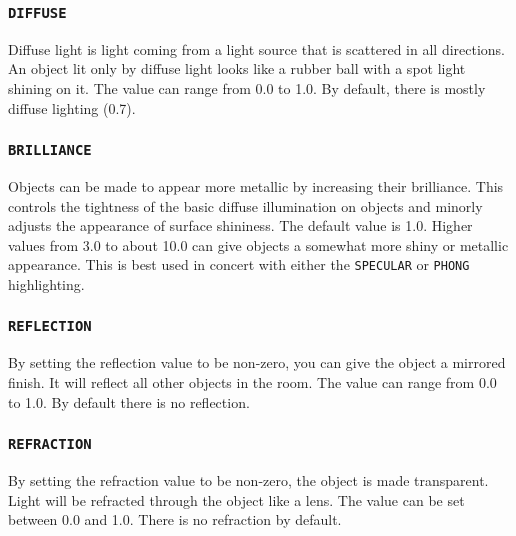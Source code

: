 \subsubsection{{\tt DIFFUSE}}

Diffuse light is light coming from a light source that is scattered in all
directions.  An object lit only by diffuse light looks like a rubber ball with
a spot light shining on it.  The value can range from 0.0 to 1.0.  By default,
there is mostly diffuse lighting (0.7).

\subsubsection{{\tt BRILLIANCE}}

Objects can be made to appear more metallic by increasing their brilliance.
This controls the tightness of the basic diffuse illumination on objects and
minorly adjusts the appearance of surface shininess.  The default value is
1.0.  Higher values from 3.0 to about 10.0 can give objects a somewhat more
shiny or metallic appearance.  This is best used in concert with either the
{\tt SPECULAR} or {\tt PHONG} highlighting.

\subsubsection{{\tt REFLECTION}}

By setting the reflection value to be non-zero, you can give the object a
mirrored finish.  It will reflect all other objects in the room.  The value
can range from 0.0 to 1.0.  By default there is no reflection. 

\subsubsection{{\tt REFRACTION}}

By setting the refraction value to be non-zero, the object is made transparent.
Light will be refracted through the object like a lens.  The value can be set
between 0.0 and 1.0.  There is no refraction by default. 

